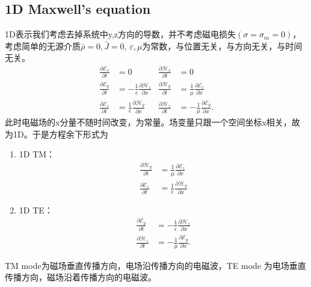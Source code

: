 \documentclass{article}
\begin{document}
\begin{CJK*}{UTF8}{gbsn}
\subsection{1D Maxwell's equation}

1D表示我们考虑去掉系统中y,z方向的导数，并不考虑磁电损失$(\sigma
= \sigma_m = 0)$，考虑简单的无源介质$\bar{\rho} = 0, \bar{J} = 0$,
$\varepsilon,
\mu$为常数，与位置无关，与方向无关，与时间无关。
\[ \begin{aligned}
     \frac{\partial \mathscr{E}_x}{\partial t} & = 0 & \frac{\partial
     \mathscr{H}_x}{\partial t} & = 0\\
     \frac{\partial \mathscr{E}_y}{\partial t} & = - \frac{1}{\epsilon} 
     \frac{\partial \mathscr{H}_z}{\partial x} & \frac{\partial
     \mathscr{H}_y}{\partial t} & = \frac{1}{\mu}  \frac{\partial
     \mathscr{E}_z}{\partial x}\\
     \frac{\partial \mathscr{E}_z}{\partial t} & = \frac{1}{\epsilon} 
     \frac{\partial \mathscr{H}_y}{\partial x} & \frac{\partial
     \mathscr{H}_z}{\partial t} & = - \frac{1}{\mu}  \frac{\partial
     \mathscr{E}_y}{\partial x} .
   \end{aligned} \]
此时电磁场的x分量不随时间改变，为常量。场变量只跟一个空间坐标x相关，故为1D。于是方程余下形式为
\begin{enumerate}
  \item 1D TM：
  \[ \begin{aligned}
       \frac{\partial \mathscr{H}_y}{\partial t} & = \frac{1}{\mu} 
       \frac{\partial \mathscr{E}_z}{\partial x}\\
       \frac{\partial \mathscr{E}_z}{\partial t} & = \frac{1}{\epsilon} 
       \frac{\partial \mathscr{H}_y}{\partial x}
     \end{aligned} \]
  \item 1D TE：
  \[ \begin{aligned}
       \frac{\partial \mathscr{E}_y}{\partial t} & = - \frac{1}{\epsilon} 
       \frac{\partial \mathscr{H}_z}{\partial x}\\
       \frac{\partial \mathscr{H}_z}{\partial t} & = - \frac{1}{\mu} 
       \frac{\partial \mathscr{E}_y}{\partial x} .
     \end{aligned} \]
  
\end{enumerate}
TM mode为磁场垂直传播方向，电场沿传播方向的电磁波，TE
mode 为电场垂直传播方向，磁场沿着传播方向的电磁波。


\end{CJK*}
\end{document}
